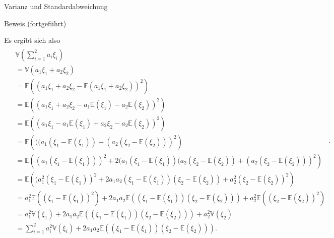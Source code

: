 \documentclass[
  8pt,
  ignorenonframetext,
]{beamer}
\begin{document}
\begin{frame}{Varianz und Standardabweichung}
\protect\hypertarget{varianz-und-standardabweichung-9}{}
\footnotesize
\vspace{2mm}

\underline{Beweis (fortgeführt)}

Es ergibt sich also \begin{align*}
\begin{split}
& \mathbb{V}\left(\sum_{i=1}^2 a_i \xi_i\right)                                                   \\
& = \mathbb{V}(a_1\xi_1 + a_2\xi_2)                                                               \\
& = \mathbb{E}\left((a_1\xi_1 + a_2\xi_2 - \mathbb{E}\left(a_1\xi_1 + a_2\xi_2\right))^2\right)   \\
& = \mathbb{E}\left((a_1\xi_1 + a_2\xi_2 - a_1\mathbb{E}(\xi_1) - a_2\mathbb{E}(\xi_2))^2\right)  \\
& = \mathbb{E}\left((a_1\xi_1 - a_1\mathbb{E}(\xi_1) + a_2\xi_2  - a_2\mathbb{E}(\xi_2))^2\right) \\
& = \mathbb{E}\left(((a_1(\xi_1 - \mathbb{E}(\xi_1)) + (a_2(\xi_2 - \mathbb{E}(\xi_2)))^2\right)  \\
& = \mathbb{E}\left((a_1(\xi_1 - \mathbb{E}(\xi_1)))^2
                   + 2(a_1(\xi_1 - \mathbb{E}(\xi_1))(a_2(\xi_2 - \mathbb{E}(\xi_2))
                   + (a_2(\xi_2 - \mathbb{E}(\xi_2)))^2\right) \\
& = \mathbb{E}\left((a_1^2(\xi_1 - \mathbb{E}(\xi_1))^2
                   + 2a_1a_2(\xi_1 - \mathbb{E}(\xi_1))(\xi_2 - \mathbb{E}(\xi_2))
                   + a_2^2(\xi_2 - \mathbb{E}(\xi_2))^2\right) \\
& = a_1^2\mathbb{E}\left((\xi_1 - \mathbb{E}(\xi_1))^2\right)
   + 2a_1a_2\mathbb{E}\left((\xi_1 - \mathbb{E}(\xi_1))(\xi_2 - \mathbb{E}(\xi_2))\right)
   + a_2^2\mathbb{E}\left((\xi_2 - \mathbb{E}(\xi_2))^2\right) \\
& = a_1^2\mathbb{V}(\xi_1)
   + 2a_1a_2\mathbb{E}\left((\xi_1 - \mathbb{E}(\xi_1))(\xi_2 - \mathbb{E}(\xi_2))\right)
   + a_2^2\mathbb{V}(\xi_2) \\
& = \sum_{i=1}^2 a_i^2\mathbb{V}(\xi_i)
   + 2a_1a_2\mathbb{E}\left((\xi_1 - \mathbb{E}(\xi_1))(\xi_2 - \mathbb{E}(\xi_2))\right).
\end{split}.
\end{align*}
\end{frame}
\end{document}
